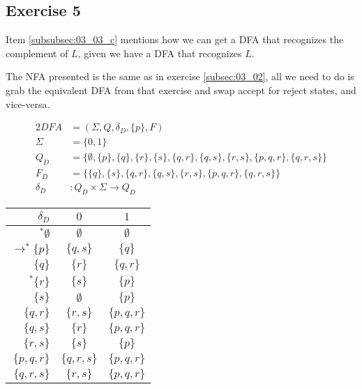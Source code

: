 \documentclass[docid=TP03]{tcom_TP}
\begin{document}
{\subsection{Exercise 5}
\begin{remark}
	Item \ref{subsubsec:03_03_c} mentions how we can get a DFA that recognizes the complement of $L$, given we have a DFA that recognizes $L$.
\end{remark}
\begin{remark}
	The NFA presented is the same as in exercise \ref{subsec:03_02}, all we need to do is grab the equivalent DFA from that exercise and swap accept for reject states, and vice-versa.
\end{remark}
\begin{alignat*}{2}
	DFA       &= (\Sigma, Q, \delta_D, \{p\}, F)\\
	\Sigma    &= \{0,1\}\\
	Q_D       &= \{\emptyset,\{p\},\{q\},\{r\},\{s\},\{q,r\},\{q,s\},\{r,s\},\{p,q,r\},\{q,r,s\}\}\\
	F_D       &= \{\{q\},\{s\},\{q,r\},\{q,s\},\{r,s\},\{p,q,r\},\{q,r,s\}\}\\
	\delta_D &\colon Q_D \times \Sigma \rightarrow Q_D
\end{alignat*}
\begin{center}
\begin{tabular}{ r | c c }
 $\delta_D$ & $0$ & $1$ \\
 \hline
 $^* \emptyset             $ & $\emptyset  $ & $\emptyset  $ \\
 $\rightarrow^* \{p      \}$ & $\{  q,  s\}$ & $\{  q    \}$ \\  
 $                 \{  q    \}$ & $\{    r  \}$ & $\{  q,r  \}$ \\
 $^*            \{    r  \}$ & $\{      s\}$ & $\{p      \}$ \\
 $                 \{      s\}$ & $\emptyset  $ & $\{p      \}$ \\
 $                 \{  q,r  \}$ & $\{    r,s\}$ & $\{p,q,r  \}$ \\
 $                 \{  q,  s\}$ & $\{    r  \}$ & $\{p,q,r  \}$ \\
 $                 \{    r,s\}$ & $\{      s\}$ & $\{p      \}$ \\
 $                 \{p,q,r  \}$ & $\{  q,r,s\}$ & $\{p,q,r  \}$ \\
 $                 \{  q,r,s\}$ & $\{    r,s\}$ & $\{p,q,r  \}$
\end{tabular}
\end{center}
\pagebreak
}
\end{document}
